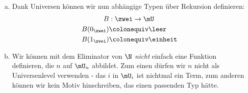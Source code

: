 \begin{beispiel}
\begin{enumerate}[(a)]
\item Dank Universen können wir nun abhängige Typen über Rekursion definieren:
  \begin{align*}
    B&:\zwei\to\mU \\
    B(0_{\zwei})&\colonequiv \leer \\
    B(1_{\zwei})&\colonequiv \einheit
  \end{align*}
\item Wir können mit dem Eliminator von $\N$ \emph{nicht} einfach eine Funktion definieren,
  die $n$ auf $\mU_n$ abbildet. Zum einen dürfen wir $n$ nicht als Universenlevel verwenden -
  das $i$ in $\mU_i$ ist nichtmal ein Term, zum anderen können wir kein Motiv hinschreiben,
  das einen passenden Typ hätte.
\end{enumerate}
\end{beispiel}
